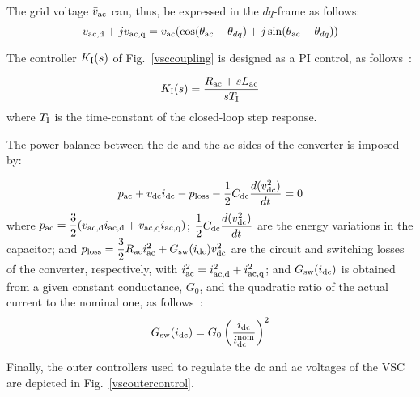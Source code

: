 \documentclass[journal, a4paper]{IEEEtran}
\begin{document}
The grid voltage $\bar{v}_{\rm ac}$ can, thus, be 
expressed in the $dq$-frame as follows:
\begin{equation}
	v_{\rm ac,d} + jv_{\rm ac,q} = v_{\rm ac} (\cos(\theta_{\rm ac} - \theta_{dq}) + 
																 j\sin(\theta_{\rm ac} - \theta_{dq}))												
  \label{vacdq}
\end{equation}

The controller $K_{\rm I} (s)$ of Fig.~\ref{vsccoupling} is
designed as a PI control, as follows~\cite{Chauduri:14}:

\begin{equation}
	K_{\rm I} (s) = \dfrac{R_{\rm ac} + s L_{\rm ac}}{s T_{\rm I}}							
  \label{kIvsc}
\end{equation}
where $T_{\rm I}$ is the time-constant of the closed-loop step response.

The power balance between the
dc and the ac sides of the converter is imposed by:

\begin{equation}
	p_{\rm ac} + v_{\rm dc} i_{\rm dc} - p_{\rm loss} - 
		\dfrac{1}{2} C_{\rm dc} \dfrac{d (v_{\rm dc}^2)}{dt} = 0
  \label{balancevsc}
\end{equation}
where $p_{\rm ac} = \dfrac{3}{2} (v_{\rm ac,d} i_{\rm ac,d} + v_{\rm ac,q} i_{\rm ac,q}	)$; 
$\dfrac{1}{2} C_{\rm dc} \dfrac{d (v_{\rm dc}^2)}{dt}$ are the energy variations in
the capacitor;
and $p_{\rm loss} = \dfrac{3}{2} R_{\rm ac} i_{\rm ac}^2 + G_{\rm sw} (i_{\rm dc})v_{\rm dc}^2$
are the circuit and switching losses of the converter, respectively,
with $i_{\rm ac}^2 = i_{\rm ac,d}^2 + i_{\rm ac,q}^2$; 
and $G_{\rm sw} (i_{\rm dc})$ is obtained 
from a given constant conductance, $G_0$, and the quadratic ratio of the actual 
current to the nominal one, as follows~\cite{acha:13}: 
\begin{equation}
  G_{\rm sw} (i_{\rm dc}) = G_0 \left(\frac{i_{\rm dc}}{i_{\rm dc}^{\rm nom}} \right)^2
  \label{VSClosses}
\end{equation}



Finally, the outer controllers used to regulate the dc and ac voltages of the VSC
are depicted in Fig.~\ref{vscoutercontrol}.  
\end{document}
